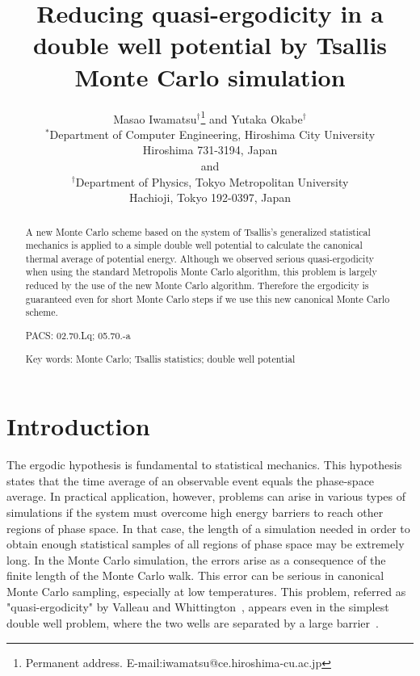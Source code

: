 

\title{
Reducing quasi-ergodicity in a double well potential by Tsallis Monte
Carlo simulation
}

\author{
Masao Iwamatsu$^{\dagger}$\thanks{Permanent address. 
E-mail:iwamatsu@ce.hiroshima-cu.ac.jp} and Yutaka Okabe$^{\dagger}$
\\$^{*}$Department of Computer Engineering, Hiroshima City University\\ 
Hiroshima 731-3194, Japan\\ and\\
$^{\dagger}$Department of Physics, Tokyo Metropolitan University\\ 
Hachioji, Tokyo 192-0397, Japan }

\date
{
}

\maketitle

\begin{abstract}
A new Monte Carlo scheme based on the system of Tsallis's generalized 
statistical mechanics is applied to a simple double well potential 
to calculate the canonical thermal average of potential energy. 
Although we observed serious quasi-ergodicity when using the standard 
Metropolis Monte Carlo algorithm, this problem is largely reduced by 
the use of the new Monte Carlo algorithm.  Therefore the ergodicity 
is guaranteed even for short Monte Carlo steps if we use this new 
canonical Monte Carlo scheme. \\

\begin{flushleft}

PACS: 02.70.Lq; 05.70.-a

Key words: Monte Carlo; Tsallis statistics; double well potential\\

\end{flushleft}
\end{abstract}

\newpage
\section{Introduction}

The ergodic hypothesis is fundamental to statistical mechanics. 
This hypothesis states that the time average of an observable 
event equals the phase-space average. In practical application,
however, problems can arise in various types of simulations 
if the system must overcome high energy barriers to reach other 
regions of phase space. In that case, the length of a simulation 
needed in order to obtain enough statistical samples of all 
regions of phase space may be extremely long. In the Monte Carlo 
simulation, the errors arise as a consequence of the finite 
length of the Monte Carlo walk. This error can be serious in 
canonical Monte Carlo sampling, especially at low temperatures.
This problem, referred as "quasi-ergodicity" by Valleau and 
Whittington~\cite{VW}, appears even in the simplest double well 
problem, where the two wells are separated by a large 
barrier~\cite{FFD}.

